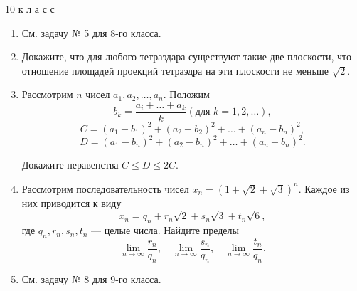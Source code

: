 \setcounter{page}{66} %
\begin{minipage}[10cm]{\textwidth}
    \setlength\columnsep{20pt}
    \setlength\parindent{24pt}
    \begin{multicols*}{2}
	 \hspace*{16pt} %
    10 к л а с с
    
    \begin{enumerate}[itemindent=32pt] %
      \setlength{\itemsep}{0pt}
      \setlength{\parskip}{0pt}
      \setcounter{enumi}{4} %
      
      \item См. задачу № 5 для 8-го класса.
      \item Докажите, что для любого тетраэдара существуют такие две плоскости, что отношение площадей проекций тетраэдра на эти плоскости не меньше $ \sqrt{2} $.
      \item Рассмотрим $n$ чисел $a_1, a_2, \dots, a_n$.
      Положим
    \[b_k = \frac{a_i + \dots + a_k}{k}  (\textrm{для } k = 1, 2, \dots) ,\] %
    \[C = (a_1 - b_1)^2 + (a_2 - b_2)^2  + \dots + (a_n - b_n)^2,\] 
    \[D = (a_1 - b_n)^2 + (a_2 - b_n)^2  + \dots + (a_n - b_n)^2. \]
    
    Докажите неравенства $ C \le D \le 2C $.
    
    \item Рассмотрим последовательность чисел $ x_n = (1 + \sqrt{2} + \sqrt{3})^n $.  Каждое из них приводится к виду
    \[ x_n = q_n + r_n\sqrt{2} + s_n\sqrt{3} + t_n\sqrt{6},\]
    где $q_n, r_n, s_n, t_n$ --- целые числа. Найдите пределы
    \[ \lim_{n\to\infty} \frac{r_n}{q_n},\quad \lim_{n\to\infty} \frac{s_n}{q_n}, \quad \lim_{n\to\infty} \frac{t_n}{q_n}. \]
    
    \item См. задачу № 8 для 9-го класса.
    \end{enumerate}
    

\end{multicols*}
\end{minipage}
